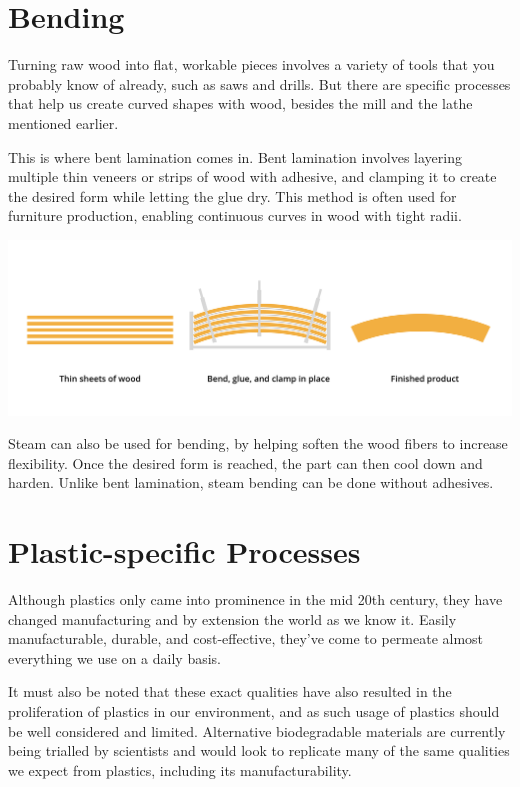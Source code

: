 \section{Bending}

Turning raw wood into flat, workable pieces involves a variety of tools that you probably know of already, such as saws and drills. But there are specific processes that help us create curved shapes with wood, besides the mill and the lathe mentioned earlier.

This is where bent lamination comes in. Bent lamination involves layering multiple thin veneers or strips of wood with adhesive, and clamping it to create the desired form while letting the glue dry. This method is often used for furniture production, enabling continuous curves in wood with tight radii.

\includegraphics[width=.75\textwidth]{woodBend.png}


Steam can also be used for bending, by helping soften the wood fibers to increase flexibility. Once the desired form is reached, the part can then cool down and harden. Unlike bent lamination, steam bending can be done without adhesives.

\section{Plastic-specific Processes}

Although plastics only came into prominence in the mid 20th century, they have changed manufacturing and by extension the world as we know it. Easily manufacturable, durable, and cost-effective, they’ve come to permeate almost everything we use on a daily basis.

It must also be noted that these exact qualities have also resulted in the proliferation of plastics in our environment, and as such usage of plastics should be well considered and limited. Alternative biodegradable materials are currently being trialled by scientists and would look to replicate many of the same qualities we expect from plastics, including its manufacturability.

